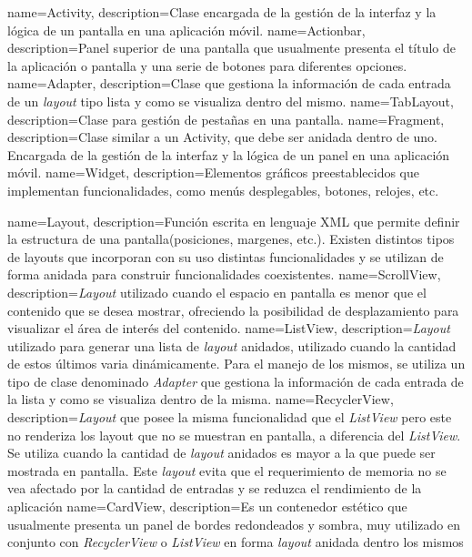 {
    name=Activity,
    description={Clase encargada de la gestión de la interfaz y la lógica de un pantalla en una aplicación móvil.}
}
{
    name=Actionbar,
    description={Panel superior de una pantalla que usualmente presenta el título de la aplicación o pantalla y una serie de botones para diferentes opciones.}
}
{
    name=Adapter,
    description={Clase que gestiona la información de cada entrada de un \textit{layout} tipo lista y como se visualiza dentro del mismo.}
}
{
    name=TabLayout,
    description={Clase para gestión de pestañas en una pantalla.}
}
{
    name=Fragment,
    description={Clase similar a un Activity, que debe ser anidada dentro de uno. Encargada de la gestión de la interfaz y la lógica de un panel en una aplicación móvil.}
}
{
    name=Widget,
    description={Elementos gráficos preestablecidos que implementan funcionalidades, como menús desplegables, botones, relojes, etc.}
}


{
    name=Layout,
    description={Función escrita en lenguaje XML que permite definir la estructura de una pantalla(posiciones, margenes, etc.). Existen distintos tipos de layouts que incorporan con su uso distintas funcionalidades y se utilizan de forma anidada para construir funcionalidades coexistentes.}
}
{
    name=ScrollView,
    description={\textit{Layout} utilizado cuando el espacio en pantalla es menor que el contenido que se desea mostrar, ofreciendo la posibilidad de desplazamiento para visualizar el área de interés del contenido.}
}
{
    name=ListView,
    description={\textit{Layout} utilizado para generar una lista de \textit{layout} anidados, utilizado cuando la cantidad de estos últimos varia dinámicamente. Para el manejo de los mismos, se utiliza un tipo de clase denominado \textit{Adapter} que gestiona la información de cada entrada de la lista y como se visualiza dentro de la misma.}
}
{
    name=RecyclerView,
    description={\textit{Layout} que posee la misma funcionalidad que el \textit{ListView} pero este no renderiza los layout que no se muestran en pantalla, a diferencia del \textit{ListView}. Se utiliza cuando la cantidad de \textit{layout} anidados es mayor a la que puede ser mostrada en pantalla. Este \textit{layout} evita que el requerimiento de memoria no se vea afectado por la cantidad de entradas y se reduzca el rendimiento de la aplicación}
}
{
    name=CardView,
    description={Es un contenedor estético que usualmente presenta un panel de bordes redondeados y sombra, muy utilizado en conjunto con \textit{RecyclerView} o \textit{ListView} en forma \textit{layout} anidada dentro los mismos}
}


